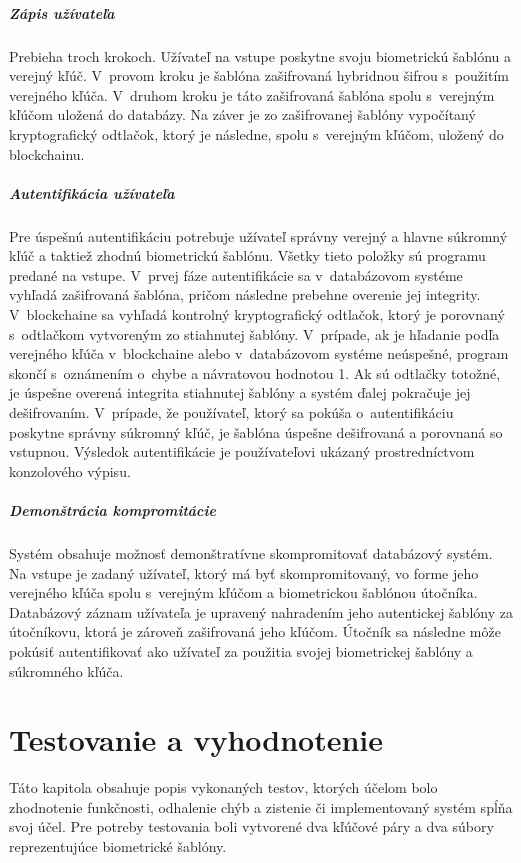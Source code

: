 \paragraph{Zápis užívateľa}
Prebieha troch krokoch. Užívateľ na vstupe poskytne svoju biometrickú šablónu a verejný kľúč. V~provom kroku je šablóna zašifrovaná hybridnou šifrou s~použitím verejného kľúča. V~druhom kroku je táto zašifrovaná šablóna spolu s~verejným kľúčom uložená do databázy. Na záver je zo zašifrovanej šablóny vypočítaný kryptografický odtlačok, ktorý je následne, spolu s~verejným kľúčom, uložený do blockchainu.

\paragraph{Autentifikácia užívateľa}
Pre úspešnú autentifikáciu potrebuje užívateľ správny verejný a hlavne súkromný kľúč a taktiež zhodnú biometrickú šablónu. Všetky tieto položky sú programu predané na vstupe.
V~prvej fáze autentifikácie sa v~databázovom systéme vyhľadá zašifrovaná šablóna, pričom následne prebehne overenie jej integrity. V~blockchaine sa vyhľadá kontrolný kryptografický odtlačok, ktorý je porovnaný s~odtlačkom vytvoreným zo stiahnutej šablóny. V~prípade, ak je hľadanie podľa verejného kľúča v~blockchaine alebo v~databázovom systéme neúspešné, program skončí s~oznámením o~chybe a návratovou hodnotou 1. Ak sú odtlačky totožné, je úspešne overená integrita stiahnutej šablóny a systém ďalej pokračuje jej dešifrovaním. V~prípade, že používateľ, ktorý sa pokúša o~autentifikáciu poskytne správny súkromný kľúč, je šablóna úspešne dešifrovaná a porovnaná so vstupnou. Výsledok autentifikácie je používateľovi ukázaný prostredníctvom konzolového výpisu.

\paragraph{Demonštrácia kompromitácie}
Systém obsahuje možnosť demonštratívne skompromitovať databázový systém. Na vstupe je zadaný užívateľ, ktorý má byť skompromitovaný, vo forme jeho verejného kľúča spolu s~verejným kľúčom a biometrickou šablónou útočníka. Databázový záznam užívateľa je upravený nahradením jeho autentickej šablóny za útočníkovu, ktorá je zároveň zašifrovaná jeho kľúčom. Útočník sa následne môže pokúsiť autentifikovať ako užívateľ za použitia svojej biometrickej šablóny a súkromného kľúča.

\chapter{Testovanie a vyhodnotenie}
Táto kapitola obsahuje popis vykonaných testov, ktorých účelom bolo zhodnotenie funkčnosti, odhalenie chýb a zistenie či implementovaný systém spĺňa svoj účel.
Pre potreby testovania boli vytvorené dva kľúčové páry a dva súbory reprezentujúce biometrické šablóny.

